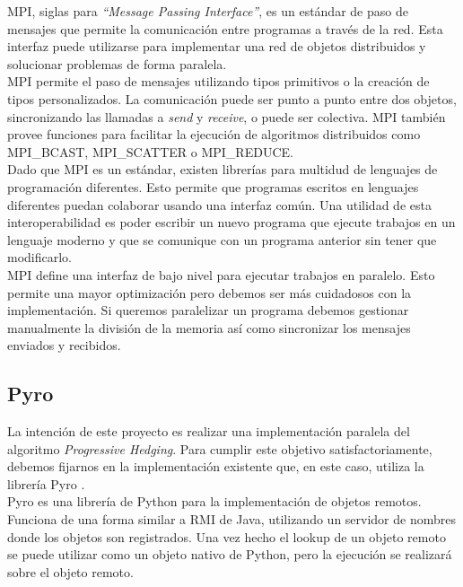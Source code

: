 MPI, siglas para \textit{``Message Passing Interface''}, es un estándar de paso de mensajes que permite la comunicación entre programas a través de la red. Esta interfaz puede utilizarse para implementar una red de objetos distribuidos y solucionar problemas de forma paralela.\\

MPI permite el paso de mensajes utilizando tipos primitivos o la creación de tipos personalizados. La comunicación puede ser punto a punto entre dos objetos, sincronizando las llamadas a \textit{send} y \textit{receive}, o puede ser colectiva. MPI también provee funciones para facilitar la ejecución de algoritmos distribuidos como MPI\_BCAST, MPI\_SCATTER o MPI\_REDUCE.\\

Dado que MPI es un estándar, existen librerías para multidud de lenguajes de programación diferentes. Esto permite que programas escritos en lenguajes diferentes puedan colaborar usando una interfaz común. Una utilidad de esta interoperabilidad es poder escribir un nuevo programa que ejecute trabajos en un lenguaje moderno y que se comunique con un programa anterior sin tener que modificarlo. \\

MPI define una interfaz de bajo nivel para ejecutar trabajos en paralelo. Esto permite una mayor optimización pero debemos ser más cuidadosos con la implementación. Si queremos paralelizar un programa debemos gestionar manualmente la división de la memoria así como sincronizar los mensajes enviados y recibidos.
 
\subsection{Pyro}

La intención de este proyecto es realizar una implementación paralela del algoritmo \textit{Progressive Hedging}. Para cumplir este objetivo satisfactoriamente, debemos fijarnos en la implementación existente que, en este caso, utiliza la librería Pyro \cite{pyro}. \\

Pyro es una librería de Python para la implementación de objetos remotos. Funciona de una forma similar a RMI de Java, utilizando un servidor de nombres donde los objetos son registrados. Una vez hecho el lookup de un objeto remoto se puede utilizar como un objeto nativo de Python, pero la ejecución se realizará sobre el objeto remoto.\\

